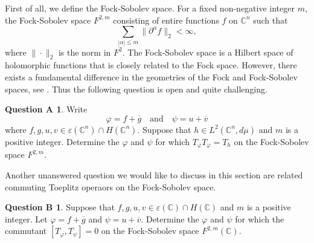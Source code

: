 \documentclass[11pt,reqno]{amsart}
\theoremstyle{definition}
\newtheorem*{declaration}{Declaration}
\newtheorem*{data}{Data availability}
\newtheorem*{proA}{Question A}
\newtheorem*{proB}{Question B}
\begin{document}
First of all, we define the Fock-Sobolev space. For a fixed non-negative integer $m$, the Fock-Sobolev space $F^{2,m}$ consisting of entire functions $f$ on $\mathbb{C}^n$ such that
$$\sum_{|\alpha|\leq m} \|\partial^\alpha f\|_2<\infty,$$
where $\|\cdot\|_2$ is the norm in $F^2.$  The Fock-Sobolev space is a  Hilbert space of holomorphic functions that is closely related to the Fock space.  However, there exists a fundamental difference in the geometries of the Fock and Fock-Sobolev spaces, see \cite{Qin}.
 Thus the following question is open and quite challenging.
\begin{proA}
 Write
$$\varphi=f+\overline{g}\quad\text{and}\quad\psi=u+\overline{v}$$
where $f,g,u,v\in \mathcal{\varepsilon}(\mathbb{C}^n)\cap H(\mathbb{C}^n)$.
Suppose that $h\in L^2(\mathbb{C}^n,d\mu)$ and $m$ is a positive integer. Determine the $\varphi$ and $\psi$ for which $T_\varphi T_\varphi=T_h$  on the Fock-Sobolev space $F^{2,m}$.
\end{proA}
Another unanswered question we would like to discuss in this section are related commuting Toeplitz operaors on the Fock-Sobolev space.
\begin{proB}
Suppose that $f,g,u,v\in \varepsilon(\mathbb{C})\cap H(\mathbb{C})$ and $m$ is a positive integer. Let $\varphi=f+\overline{g}$ and $\psi=u+\overline{v}$. Determine the $\varphi$ and $\psi$ for which the commutant $[T_\varphi,T_\psi]=0$  on the Fock-Sobolev space $F^{2,m}(\mathbb{C})$.
\end{proB}
\end{document}
